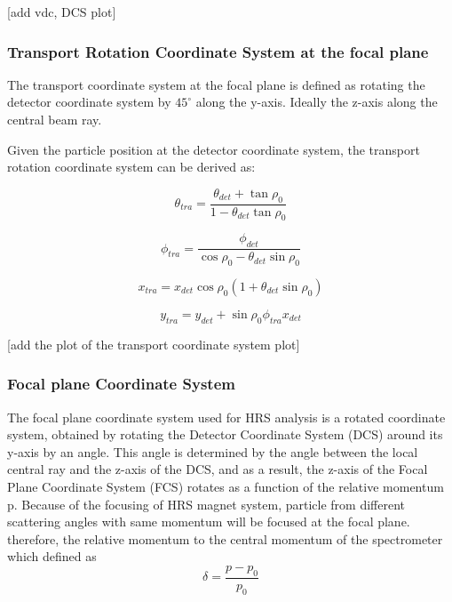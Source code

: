 [add vdc, DCS plot]

\subsubsection{Transport Rotation Coordinate System at the focal plane}
The transport coordinate system at the focal plane is defined as rotating the detector coordinate system by $45^{\circ}$ along the y-axis. Ideally the z-axis along the central beam ray. 

Given the particle position at the detector coordinate system, the transport rotation coordinate system can be derived as:

\begin{equation}
    \theta_{tra}  = \frac{\theta_{det} + \tan{\rho_0}}{1 - \theta_{det}\tan{\rho_0}} 
\end{equation}

\begin{equation}
    \phi_{tra} = \frac{\phi_{det}}{\cos{\rho_0} - \theta_{det}\sin{\rho_0}}
\end{equation}

\begin{equation}
    x_{tra} = x_{det}\cos{\rho_0}(1 + \theta_{det}\sin{\rho_0})
\end{equation}

\begin{equation}
    y_{tra} = y_{det} + \sin{\rho_0}\phi_{tra}x_{det}
\end{equation}


[add the plot of the transport coordinate system plot]


\subsubsection{Focal plane Coordinate System}

The focal plane coordinate system used for HRS analysis is a rotated coordinate system, obtained by rotating the Detector Coordinate System (DCS) around its y-axis by an angle. This angle is determined by the angle between the local central ray and the z-axis of the DCS, and as a result, the z-axis of the Focal Plane Coordinate System (FCS) rotates as a function of the relative momentum p. Because of the focusing of HRS magnet system,  particle from different scattering angles with same momentum will be focused at the focal plane. therefore, the relative momentum to the central momentum of the spectrometer which defined as 
\begin{equation}
    \delta = \frac{p-p_0}{p_0}
\end{equation}

